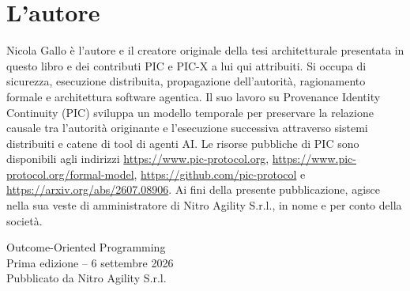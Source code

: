 \documentclass[10pt,oneside,openany]{book}
\begin{document}
\chapter*{L'autore}
Nicola Gallo è l'autore e il creatore originale della tesi architetturale presentata in questo libro e dei contributi PIC e PIC-X a lui qui attribuiti. Si occupa di sicurezza, esecuzione distribuita, propagazione dell'autorità, ragionamento formale e architettura software agentica. Il suo lavoro su Provenance Identity Continuity (PIC) sviluppa un modello temporale per preservare la relazione causale tra l'autorità originante e l'esecuzione successiva attraverso sistemi distribuiti e catene di tool di agenti AI. Le risorse pubbliche di PIC sono disponibili agli indirizzi \url{https://www.pic-protocol.org}, \url{https://www.pic-protocol.org/formal-model}, \url{https://github.com/pic-protocol} e \url{https://arxiv.org/abs/2607.08906}. Ai fini della presente pubblicazione, agisce nella sua veste di amministratore di Nitro Agility S.r.l., in nome e per conto della società.

\vfill
\begin{center}
\sffamily\small
Outcome-Oriented Programming\\
Prima edizione -- 6 settembre 2026\\
Pubblicato da Nitro Agility S.r.l.
\end{center}
\end{document}
